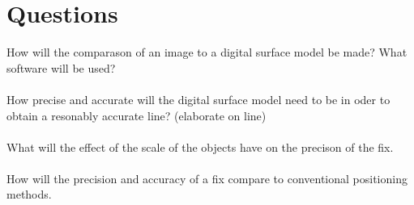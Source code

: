 

\section{Questions}
How will the comparason of an image to a digital surface model be made? What software will be used?

\paragraph{}
How precise and accurate will the digital surface model need to be in oder to obtain a resonably accurate line? (elaborate on line)

\paragraph{}
What will the effect of the scale of the objects have on the precison of the fix.

\paragraph{}
How will the precision and accuracy of a fix compare to conventional positioning methods.